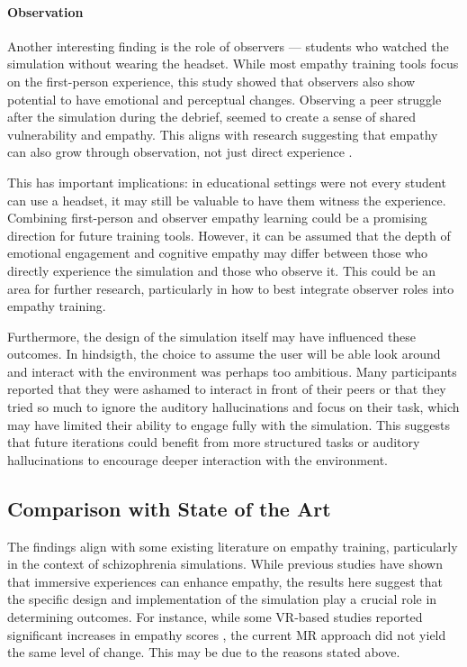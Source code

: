 \paragraph{Observation}

Another interesting finding is the role of observers — students who watched the simulation without wearing the headset. While most empathy training tools focus on the first-person experience, this study showed that observers also show potential to have  emotional and perceptual changes. Observing a peer struggle after the simulation during the debrief, seemed to create a sense of shared vulnerability and empathy. This aligns with research suggesting that empathy can also grow through observation, not just direct experience \cite{Formosa2018}.
\vspace{1em}

This has important implications: in educational settings were not every student can use a headset, it may still be valuable to have them witness the experience. Combining first-person and observer empathy learning could be a promising direction for future training tools. However, it can be assumed that the depth of emotional engagement and cognitive empathy may differ between those who directly experience the simulation and those who observe it. This could be an area for further research, particularly in how to best integrate observer roles into empathy training. 

\vspace{1em}

Furthermore, the design of the simulation itself may have influenced these outcomes. In hindsigth, the choice to assume the user will be able look around and interact with the environment was perhaps too ambitious. Many participants reported that they were ashamed to interact in front of their peers or that they tried so much to ignore the auditory hallucinations and focus on their task, which may have limited their ability to engage fully with the simulation. This suggests that future iterations could benefit from more structured tasks or auditory hallucinations to encourage deeper interaction with the environment.


\subsection{Comparison with State of the Art}
The findings align with some existing literature on empathy training, particularly in the context of schizophrenia simulations. While previous studies have shown that immersive experiences can enhance empathy, the results here suggest that the specific design and implementation of the simulation play a crucial role in determining outcomes. For instance, while some VR-based studies reported significant increases in empathy scores \cite{Martingano2021, Ventura2020}, the current MR approach did not yield the same level of change. This may be due to the reasons stated above.

